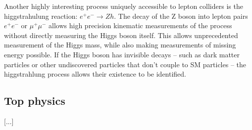 Another highly interesting process uniquely accessible to lepton colliders is the higgstrahulung reaction: $e^+ e^- \rightarrow Zh$. The decay of the Z boson into lepton pairs $e^+ e^-$ or $\mu^+ \mu^-$ allows high precision kinematic measurements of the process without directly measuring the Higgs boson itself. This allows unprecedented measurement of the Higgs mass, while also making measurements of missing energy possible. If the Higgs boson has invisible decays -- such as dark matter particles or other undiscovered particles that don't couple to \acrshort{SM} particles -- the higgstrahlung process allows their existence to be identified.


\subsection{Top physics}
[...]


